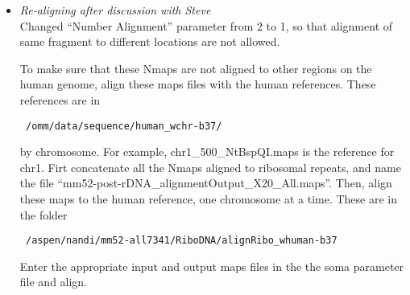 \documentclass[11pt]{article}
\begin{document}
\begin{enumerate}
\begin{itemize}
\item \emph{Re-aligning after discussion with Steve} \\
Changed ``Number Alignment'' parameter from 2 to 1, so that alignment of same fragment to different locations are not allowed. 

To make sure that these Nmaps are not aligned to other regions on the human genome, align these maps files with the human references. These references are in 
\begin{verbatim} /omm/data/sequence/human_wchr-b37/ \end{verbatim} 
by chromosome. For example, chr1\_500\_NtBspQI.maps is the reference for chr1. Firt concatenate all the Nmaps aligned to ribosomal repeats, and name the file
``mm52-post-rDNA\_alignmentOutput\_X20\_All.maps''. Then, align these maps to the human reference, one chromosome at a time. These are in the folder 
\begin{verbatim} /aspen/nandi/mm52-all7341/RiboDNA/alignRibo_whuman-b37\end{verbatim} 
Enter the appropriate input and output maps files in the the soma parameter file and align. 

\end{itemize}
\end{enumerate}
\end{document}
